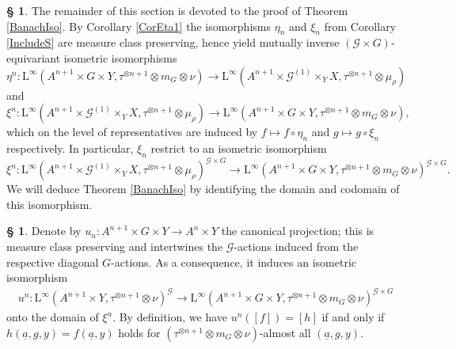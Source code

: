 \documentclass[11pt, oneside]{amsart}
\theoremstyle{definition}
\newtheorem{no}[lemma]{\S}
\theoremstyle{remark}
\theoremstyle{TheoremNum}
\newcommand{\Linf}{\mathrm{L}^{\infty}}
\newcommand{\cG}{\mathcal{G}}
\begin{document}
\begin{no}\label{BasicIsoBanach}
The remainder of this section is devoted to the proof of Theorem \ref{BanachIso}. By Corollary \ref{CorEta1} the isomorphisms $\eta_n$ and $\xi_n$ from Corollary \ref{IncludeS} are measure class preserving, hence yield mutually inverse $(\cG \times G)$-equivariant isometric isomorphisms
\[
\eta^{n}:  \Linf(A^{n+1}\times G\times Y , \tau^{\otimes n+1} \otimes m_G \otimes \nu) \to \Linf(A^{n+1}\times \mathcal{G}^{(1)}\times_Y X, \tau^{\otimes n+1} \otimes {\mu}_\rho)
\]
and 
\[
\xi^{n}: \Linf(A^{n+1}\times \mathcal{G}^{(1)}\times_Y X, \tau^{\otimes n+1} \otimes {\mu}_\rho)  \to \Linf(A^{n+1}\times G\times Y , \tau^{\otimes n+1} \otimes m_G \otimes \nu),
\]
which on the level of representatives are induced by $f \mapsto f \circ \eta_n$ and $g \mapsto g \circ \xi_n$ respectively. In particular, $\xi_n$ restrict to an isometric isomorphism
\[
\xi^{n}: \Linf(A^{n+1}\times \mathcal{G}^{(1)}\times_Y X, \tau^{\otimes n+1} \otimes {\mu}_\rho)^{\cG \times G}  \to \Linf(A^{n+1}\times G\times Y , \tau^{\otimes n+1} \otimes m_G \otimes \nu)^{\cG \times G}.
\]
We will deduce Theorem \ref{BanachIso} by identifying the domain and codomain of this isomorphism.
\end{no}
 \begin{no}\label{Isou} Denote by  $u_n: A^{n+1} \times G \times Y \to A^n \times Y$ the canonical projection; this is measure class preserving and intertwines the $\cG$-actions induced from the respective diagonal $G$-actions. As a consequence, it induces an isometric isomorphism 
  \begin{gather*}
  u^n:\Linf(A^{n+1} \times Y,\tau^{\otimes n+1} \otimes \nu)^{\cG} \to \Linf(A^{n+1}\times G\times Y,\tau^{\otimes n+1} \otimes m_G\otimes \nu)^{\cG \times G}
\end{gather*}
onto the domain of $\xi^n$. By definition, we have $u^n([f]) = [h]$ if and only if $h(\underline{a}, g, y) = f(\underline{a}, y)$ holds for $(\tau^{\otimes n+1} \otimes m_G\otimes \nu)$-almost all $(\underline{a}, g, y)$.
\end{no}
\end{document}
